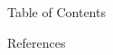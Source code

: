 \documentclass{beamer}[8pt]
\begin{document}
	\maketitle

	\begin{frame}{Table of Contents}

		\tableofcontents

	\end{frame}

	

	\maketitle
	
	\begin{frame}[allowframebreaks]{References}
		
		\printbibliography%

	\end{frame}
	
\end{document}
